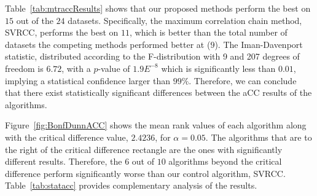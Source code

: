 \documentclass[reqno]{vcuthesis}
\numberwithin{equation}{chapter}
\begin{document}
Table~{\ref{tab:mtraccResults}} shows that our proposed methods perform the best on $15$ out of the $24$ datasets. Specifically, the maximum correlation chain method, SVRCC, performs the best on $11$, which is better than the total number of datasets the competing methods performed better at ($9$). The Iman-Davenport statistic, distributed according to the F-distribution with 9 and 207 degrees of freedom is $6.72$, with a $p$-value of $1.9E^{-8}$ which is significantly less than $0.01$, implying a statistical confidence larger than $99\%$. Therefore, we can conclude that there exist statistically significant differences between the aCC results of the algorithms.

Figure~{\ref{fig:BonfDunnACC}} shows the mean rank values of each algorithm along with the critical difference value, $2.4236$, for $\alpha = 0.05$. The algorithms that are to the right of the critical difference rectangle are the ones with significantly different results. Therefore, the $6$ out of $10$ algorithms beyond the critical difference perform significantly worse than our control algorithm, SVRCC. Table~{\ref{tab:statacc}} provides complementary analysis of the results. 
\end{document}
